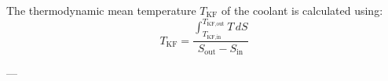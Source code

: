 The thermodynamic mean temperature \( T_{\text{KF}} \) of the coolant is calculated using:  
\[
T_{\text{KF}} = \frac{\int_{T_{\text{KF,in}}}^{T_{\text{KF,out}}} T \, dS}{S_{\text{out}} - S_{\text{in}}}
\]  

---